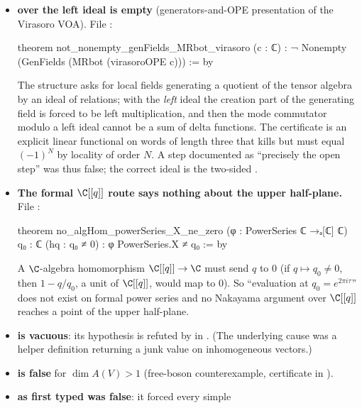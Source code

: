 \begin{itemize}
\item \textbf{ over the left ideal  is empty} (generators-and-OPE
  presentation of the Virasoro VOA). File :
\begin{leancode}
theorem not_nonempty_genFields_MRbot_virasoro (c : ℂ) :
    ¬ Nonempty (GenFields (MRbot (virasoroOPE c))) := by
\end{leancode}
  The structure  asks for local fields generating a quotient of the tensor
  algebra by an ideal of relations; with the \emph{left} ideal  the creation part of
  the generating field is forced to be left multiplication, and then the mode commutator modulo a
  left ideal cannot be a sum of delta functions. The certificate is an explicit linear functional
  on words of length three that kills  but must equal $(-1)^N$ by locality of order $N$.
  A step documented as ``precisely the open step'' was thus false; the correct ideal is the
  two-sided .
\item \textbf{The formal $\C[[q]]$ route says nothing about the upper half-plane.} File
  :
\begin{leancode}
theorem no_algHom_powerSeries_X_ne_zero (φ : PowerSeries ℂ →ₐ[ℂ] ℂ) {q₀ : ℂ} (hq : q₀ ≠ 0) :
    φ PowerSeries.X ≠ q₀ := by
\end{leancode}
  A $\C$-algebra homomorphism $\C[[q]]\to\C$ must send $q$ to $0$ (if $q\mapsto q_0\ne0$, then
  $1-q/q_0$, a unit of $\C[[q]]$, would map to $0$). So ``evaluation at $q_0=e^{2\pi i\tau}$''
  does not exist on formal power series and no Nakayama argument over $\C[[q]]$ reaches a point of
  the upper half-plane.
\item \textbf{ is vacuous}: its
  hypothesis  is refuted by  in
  . (The underlying cause was a helper
  definition returning a junk value on inhomogeneous vectors.)
\item \textbf{ is false} for $\dim A(V)>1$ (free-boson
  counterexample, certificate  in
  ).
\item \textbf{ as first typed was false}: it forced every simple

\end{itemize}
